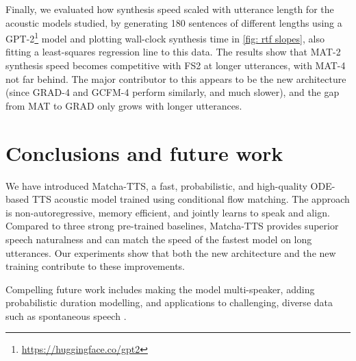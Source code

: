 \documentclass[british]{article}
\newcommand{\customurl}[1]{\url{#1}}
\begin{document}
Finally, we evaluated how synthesis speed scaled with utterance length for the acoustic models studied, by generating 180 sentences of different lengths using a GPT-2\footnote{\customurl{https://huggingface.co/gpt2}} model and plotting wall-clock synthesis time in \cref{fig: rtf slopes}, also fitting a least-squares regression line to this data.
The results show that MAT-2 synthesis speed becomes competitive with FS2 at longer utterances, with MAT-4 not far behind.
The major contributor to this appears to be the new architecture (since GRAD-4 and GCFM-4 perform similarly, and much slower), and the gap from MAT to GRAD only grows with longer utterances.



\section{Conclusions and future work}
\label{sec:conclusion}
We have introduced Matcha-TTS, a fast, probabilistic, and high-quality ODE-based TTS acoustic model trained using conditional flow matching.
The approach is non-autoregressive, memory efficient, and jointly learns to speak and align.
Compared to three strong pre-trained baselines, Matcha-TTS provides superior speech naturalness and can match the speed of the fastest model on long utterances.
Our experiments show that both the new architecture and the new training contribute to these improvements.


Compelling future work includes making the model multi-speaker, adding probabilistic duration modelling, and applications to challenging, diverse data such as spontaneous speech \cite{szekely2019spontaneous}.



\end{document}
